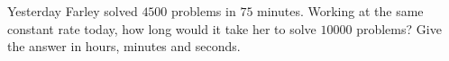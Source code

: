 Yesterday Farley solved $4500$ problems in $75$ minutes. Working at the same constant rate today, how long would it take her to solve $10000$ problems? Give the answer in hours, minutes and seconds.
